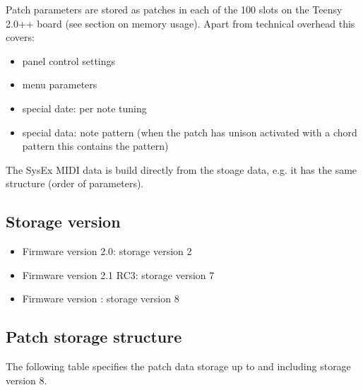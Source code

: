Patch parameters are stored as patches in each of the 100 slots on the Teensy 2.0++ board (see section on memory usage). Apart from technical overhead this covers:
\begin{itemize}
  \item panel control settings
  \item menu parameters
  \item special date: per note tuning
  \item special data: note pattern (when the patch has unison activated with a chord pattern this contains the pattern) 
\end{itemize}
The SysEx MIDI data is build directly from the stoage data, e.g. it has the same structure (order of parameters). 

\subsection{Storage version}

\begin{itemize}
  \item Firmware version 2.0: storage version 2
  \item Firmware version 2.1 RC3: storage version 7
  \item Firmware version \version: storage version 8  
\end{itemize}


\subsection{Patch storage structure}

The following table specifies the patch data storage up to and including storage version 8. 

\footnotesize
\renewcommand{\arraystretch}{1.3}

